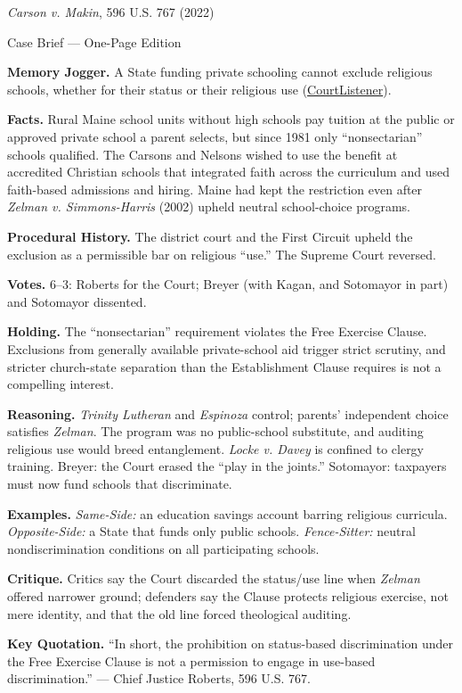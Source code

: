 \documentclass[12pt]{article}
\begin{document}
\begin{center}
{\Large \textit{Carson v. Makin}, 596 U.S. 767 (2022)\par}
\vspace{0.3em}
{\normalsize Case Brief --- One-Page Edition\par}
\end{center}

\textbf{Memory Jogger.} A State funding private schooling cannot exclude religious schools, whether for their status or their religious use (\href{https://www.courtlistener.com/opinion/6479298/carson-v-makin/}{CourtListener}).

\textbf{Facts.} Rural Maine school units without high schools pay tuition at the public or approved private school a parent selects, but since 1981 only ``nonsectarian'' schools qualified. The Carsons and Nelsons wished to use the benefit at accredited Christian schools that integrated faith across the curriculum and used faith-based admissions and hiring. Maine had kept the restriction even after \textit{Zelman v. Simmons-Harris} (2002) upheld neutral school-choice programs.

\textbf{Procedural History.} The district court and the First Circuit upheld the exclusion as a permissible bar on religious ``use.'' The Supreme Court reversed.

\textbf{Votes.} 6--3: Roberts for the Court; Breyer (with Kagan, and Sotomayor in part) and Sotomayor dissented.

\textbf{Holding.} The ``nonsectarian'' requirement violates the Free Exercise Clause. Exclusions from generally available private-school aid trigger strict scrutiny, and stricter church-state separation than the Establishment Clause requires is not a compelling interest.

\textbf{Reasoning.} \textit{Trinity Lutheran} and \textit{Espinoza} control; parents' independent choice satisfies \textit{Zelman}. The program was no public-school substitute, and auditing religious use would breed entanglement. \textit{Locke v. Davey} is confined to clergy training. Breyer: the Court erased the ``play in the joints.'' Sotomayor: taxpayers must now fund schools that discriminate.

\textbf{Examples.} \emph{Same-Side:} an education savings account barring religious curricula. \emph{Opposite-Side:} a State that funds only public schools. \emph{Fence-Sitter:} neutral nondiscrimination conditions on all participating schools.

\textbf{Critique.} Critics say the Court discarded the status/use line when \textit{Zelman} offered narrower ground; defenders say the Clause protects religious exercise, not mere identity, and that the old line forced theological auditing.

\textbf{Key Quotation.} ``In short, the prohibition on status-based discrimination under the Free Exercise Clause is not a permission to engage in use-based discrimination.'' --- Chief Justice Roberts, 596 U.S. 767.
\end{document}
